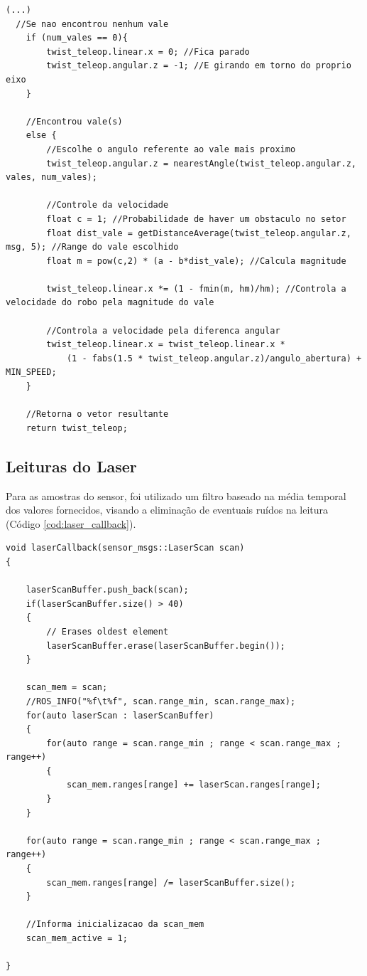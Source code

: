 \begin{lstlisting}[frame=single, label=cod:vales, style=customc, caption={Escolha da direção e velocidade}]
(...)
  //Se nao encontrou nenhum vale
    if (num_vales == 0){
        twist_teleop.linear.x = 0; //Fica parado
        twist_teleop.angular.z = -1; //E girando em torno do proprio eixo
    }
    
    //Encontrou vale(s)
    else {
        //Escolhe o angulo referente ao vale mais proximo
        twist_teleop.angular.z = nearestAngle(twist_teleop.angular.z, vales, num_vales);
        
        //Controle da velocidade
        float c = 1; //Probabilidade de haver um obstaculo no setor
        float dist_vale = getDistanceAverage(twist_teleop.angular.z, msg, 5); //Range do vale escolhido
        float m = pow(c,2) * (a - b*dist_vale); //Calcula magnitude
        
        twist_teleop.linear.x *= (1 - fmin(m, hm)/hm); //Controla a velocidade do robo pela magnitude do vale
        
        //Controla a velocidade pela diferenca angular
        twist_teleop.linear.x = twist_teleop.linear.x *
            (1 - fabs(1.5 * twist_teleop.angular.z)/angulo_abertura) + MIN_SPEED;
    }
    
    //Retorna o vetor resultante
    return twist_teleop;

\end{lstlisting}

\subsection{Leituras do Laser}

Para as amostras do sensor, foi utilizado um filtro baseado na média
temporal dos valores fornecidos, visando a eliminação de eventuais
ruídos na leitura (Código \ref{cod:laser_callback}).

\begin{lstlisting}[frame=single, label=cod:laser_callback, style=customc, caption={Filtro de amostras do laser}]
void laserCallback(sensor_msgs::LaserScan scan)
{
    
    laserScanBuffer.push_back(scan);
    if(laserScanBuffer.size() > 40)
    {
        // Erases oldest element
        laserScanBuffer.erase(laserScanBuffer.begin());
    }
    
    scan_mem = scan;
    //ROS_INFO("%f\t%f", scan.range_min, scan.range_max);
    for(auto laserScan : laserScanBuffer)
    {
        for(auto range = scan.range_min ; range < scan.range_max ; range++)
        {
            scan_mem.ranges[range] += laserScan.ranges[range];
        }
    }
    
    for(auto range = scan.range_min ; range < scan.range_max ; range++)
    {
        scan_mem.ranges[range] /= laserScanBuffer.size();
    }
    
    //Informa inicializacao da scan_mem
    scan_mem_active = 1;
    
}
\end{lstlisting}
